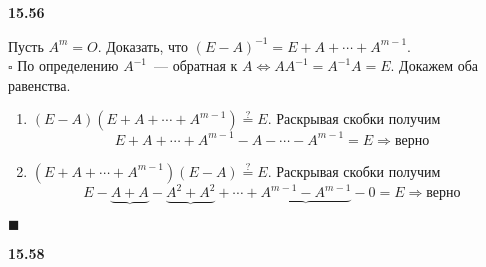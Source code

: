\documentclass[a4paper,12pt]{article} %
\begin{document}
\noindent\textbf{15.56\\}

Пусть $ A^m=O $. Доказать, что 
$ (E-A)^{-1}=E+A+\cdots+A^{m-1}$.\\

$ \square $ По определению $ A^{-1} $~--- обратная к 
$ A \iff AA^{-1}=A^{-1}A=E $. Докажем оба равенства.
\begin{enumerate}
	\item $ (E-A)(E+A+\cdots+A^{m-1})\stackrel{?}{=}E $.
	Раскрывая скобки получим
	\[
		E+A+\cdots+A^{m-1}-A-\cdots-A^{m-1}=E \Longrightarrow \textbf{верно}
	\]
	\item $ (E+A+\cdots+A^{m-1})(E-A)\stackrel{?}{=}E $.
	Раскрывая скобки получим
	\[
	E-\underbrace{A+A}-\underbrace{A^2+A^2}+\cdots+
	\underbrace{A^{m-1}-A^{m-1}}-0=E \Longrightarrow \textbf{верно}
	\]
\end{enumerate}\hfill$ \blacksquare $

\noindent\textbf{15.58\\}
\end{document}
